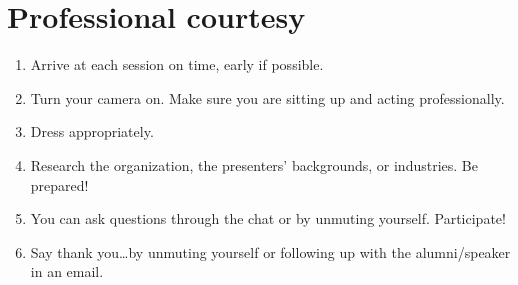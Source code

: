 \documentclass[11pt]{article}
\begin{document}
\section{Professional courtesy}
\label{sec:orgb6f99db}
\begin{enumerate}
\item Arrive at each session on time, early if possible.
\item Turn your camera on. Make sure you are sitting up and acting professionally.
\item Dress appropriately.
\item Research the organization, the presenters’ backgrounds, or industries. Be prepared!
\item You can ask questions through the chat or by unmuting yourself. Participate!
\item Say thank you\ldots{}by unmuting yourself or following up with the alumni/speaker in an email.
\end{enumerate}
\end{document}
